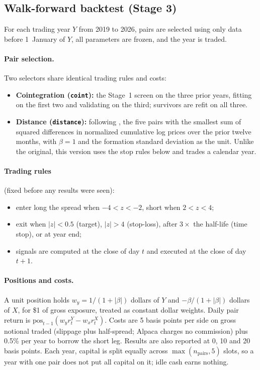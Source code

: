 \documentclass[11pt]{article}
\newcommand{\code}[1]{\texttt{#1}}
\begin{document}
\subsection{Walk-forward backtest (Stage 3)}

For each trading year $Y$ from 2019 to 2026, pairs are selected using only data before
1~January of $Y$, all parameters are frozen, and the year is traded.

\paragraph{Pair selection.} Two selectors share identical trading rules and costs:
\begin{itemize}
  \item \textbf{Cointegration (\code{coint}):} the Stage~1 screen on the three prior years,
        fitting on the first two and validating on the third; survivors are refit on all three.
  \item \textbf{Distance (\code{distance}):} following \citet{gatev2006}, the five pairs with
        the smallest sum of squared differences in normalized cumulative log prices over the
        prior twelve months, with $\beta=1$ and the formation standard deviation as the unit.
        Unlike the original, this version uses the stop rules below and trades a calendar year.
\end{itemize}

\paragraph{Trading rules} (fixed before any results were seen):
\begin{itemize}
  \item enter long the spread when $-4<z<-2$, short when $2<z<4$;
  \item exit when $|z|<0.5$ (target), $|z|>4$ (stop-loss), after $3\times$ the half-life
        (time stop), or at year end;
  \item signals are computed at the close of day $t$ and executed at the close of day $t+1$.
\end{itemize}

\paragraph{Positions and costs.} A unit position holds $w_y=1/(1+|\beta|)$ dollars of $Y$ and
$-\beta/(1+|\beta|)$ dollars of $X$, for \$1 of gross exposure, treated as constant dollar
weights. Daily pair return is $\text{pos}_{t-1}(w_y r^Y_t - w_x r^X_t)$. Costs are 5 basis
points per side on gross notional traded (slippage plus half-spread; Alpaca charges no
commission) plus 0.5\% per year to borrow the short leg. Results are also reported at 0, 10
and 20 basis points. Each year, capital is split equally across $\max(n_{\text{pairs}},5)$
slots, so a year with one pair does not put all capital on it; idle cash earns nothing.
\end{document}
